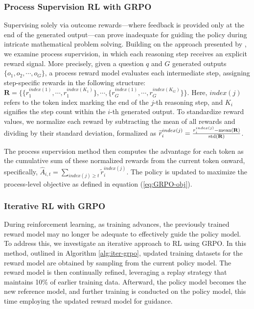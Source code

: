\begin{itemize}[topsep=0pt]
\begin{itemize}[topsep=0pt]
\subsubsection{Process Supervision RL with GRPO} Supervising solely via outcome rewards—where feedback is provided only at the end of the generated output—can prove inadequate for guiding the policy during intricate mathematical problem solving. Building on the approach presented by \cite{wang2023math}, we examine process supervision, in which each reasoning step receives an explicit reward signal. More precisely, given a question $q$ and $G$ generated outputs $\{o_1, o_2, \cdots, o_G\}$, a process reward model evaluates each intermediate step, assigning step-specific rewards in the following structure: $\mathbf{R} = \{ \{r_1^{index(1)},\cdots,r_1^{index(K_1)}\}, \cdots,  \{r_G^{index(1)},\cdots,r_G^{index(K_G)}\} \}$. Here, $index(j)$ refers to the token index marking the end of the $j$-th reasoning step, and $K_i$ signifies the step count within the $i$-th generated output. To standardize reward values, we normalize each reward by subtracting the mean of all rewards and dividing by their standard deviation, formalized as $\widetilde{r}_i^{index(j)} = \frac{r_i^{index(j)} - {\rm mean(\mathbf{R})}}{{\rm std(\mathbf{R})}}$.

The process supervision method then computes the advantage for each token as the cumulative sum of these normalized rewards from the current token onward, specifically, $\hat{A}_{i, t} = \sum_{index(j) \ge t} \widetilde{r}_i^{index(j)}$. The policy is updated to maximize the process-level objective as defined in equation (\ref{eq:GRPO-obj}).

\subsubsection{Iterative RL with GRPO} During reinforcement learning, as training advances, the previously trained reward model may no longer be adequate to effectively guide the policy model. To address this, we investigate an iterative approach to RL using GRPO. In this method, outlined in Algorithm \ref{alg:iter-grpo}, updated training datasets for the reward model are obtained by sampling from the current policy model. The reward model is then continually refined, leveraging a replay strategy that maintains 10\% of earlier training data. Afterward, the policy model becomes the new reference model, and further training is conducted on the policy model, this time employing the updated reward model for guidance.


\end{itemize}
\end{itemize}
